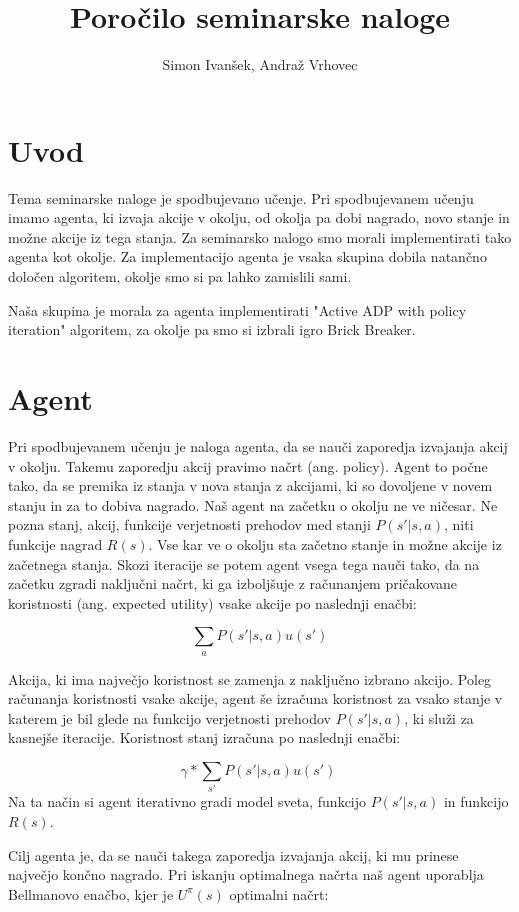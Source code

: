 \documentclass[a4paper]{article}
\title{Poročilo seminarske naloge}
\author{Simon Ivanšek, Andraž Vrhovec}
\begin{document}
\maketitle

\section{Uvod}
Tema seminarske naloge je spodbujevano učenje. Pri spodbujevanem učenju imamo agenta, ki izvaja akcije v okolju, od okolja pa dobi nagrado, novo stanje in možne akcije iz tega stanja. Za seminarsko nalogo smo morali implementirati tako agenta kot okolje. Za implementacijo agenta je vsaka skupina dobila natančno določen algoritem, okolje smo si pa lahko zamislili sami. 

Naša skupina je morala za agenta implementirati "Active ADP with policy iteration" algoritem, za okolje pa smo si izbrali igro Brick Breaker. 

\section{Agent}
Pri spodbujevanem učenju je naloga agenta, da se nauči zaporedja izvajanja akcij v okolju. Takemu zaporedju akcij pravimo načrt (ang. policy).  Agent to počne tako, da se premika iz stanja v nova stanja z akcijami, ki so dovoljene v novem stanju in za to dobiva nagrado. Naš agent na začetku o okolju ne ve ničesar. Ne pozna stanj, akcij, funkcije verjetnosti prehodov med stanji \(P(s' | s, a)\), niti funkcije nagrad \(R(s)\). Vse kar ve o okolju sta začetno stanje in možne akcije iz začetnega stanja. Skozi iteracije se potem agent vsega tega nauči tako, da na začetku zgradi naključni načrt, ki ga izboljšuje z računanjem pričakovane koristnosti (ang. expected utility) vsake akcije po naslednji enačbi:

\[\sum_{a} P(s' | s, a) u(s')\]

Akcija, ki ima največjo koristnost se zamenja z naključno izbrano akcijo. Poleg računanja koristnosti vsake akcije, agent še izračuna koristnost za vsako stanje v katerem je bil glede na funkcijo verjetnosti prehodov \(P(s' | s, a)\),  ki služi za kasnejše iteracije. Koristnost stanj izračuna po naslednji enačbi:

\[\gamma * \sum_{s'} P(s' | s, a) u(s')\ \]
Na ta način si agent iterativno gradi model sveta, funkcijo \(P(s'| s, a)\) in funkcijo \(R(s)\). 

Cilj agenta je, da se nauči takega zaporedja izvajanja akcij, ki mu prinese največjo končno nagrado. Pri iskanju optimalnega načrta naš agent uporablja Bellmanovo enačbo, kjer je \(U^{\pi}(s)\) optimalni načrt:
\end{document}
